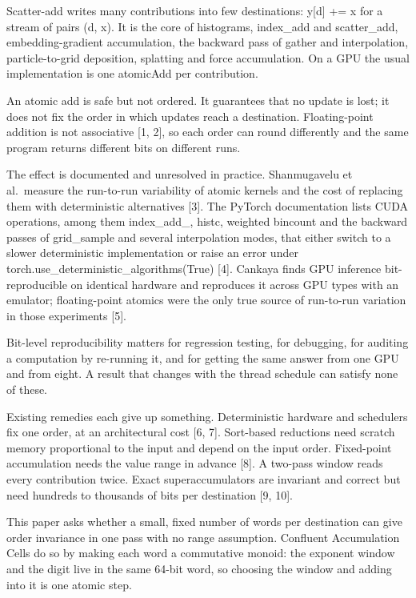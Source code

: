 \documentclass[journal]{IEEEtran}
\begin{document}
Scatter-add writes many contributions into few destinations: y{[}d{]} +=
x for a stream of pairs (d, x). It is the core of histograms, index\_add
and scatter\_add, embedding-gradient accumulation, the backward pass of
gather and interpolation, particle-to-grid deposition, splatting and
force accumulation. On a GPU the usual implementation is one atomicAdd
per contribution.

An atomic add is safe but not ordered. It guarantees that no update is
lost; it does not fix the order in which updates reach a destination.
Floating-point addition is not associative {[}1, 2{]}, so each order can
round differently and the same program returns different bits on
different runs.

The effect is documented and unresolved in practice. Shanmugavelu et
al.~measure the run-to-run variability of atomic kernels and the cost of
replacing them with deterministic alternatives {[}3{]}. The PyTorch
documentation lists CUDA operations, among them index\_add\_, histc,
weighted bincount and the backward passes of grid\_sample and several
interpolation modes, that either switch to a slower deterministic
implementation or raise an error under
torch.use\_deterministic\_algorithms(True) {[}4{]}. Cankaya finds GPU
inference bit-reproducible on identical hardware and reproduces it
across GPU types with an emulator; floating-point atomics were the only
true source of run-to-run variation in those experiments {[}5{]}.

Bit-level reproducibility matters for regression testing, for debugging,
for auditing a computation by re-running it, and for getting the same
answer from one GPU and from eight. A result that changes with the
thread schedule can satisfy none of these.

Existing remedies each give up something. Deterministic hardware and
schedulers fix one order, at an architectural cost {[}6, 7{]}.
Sort-based reductions need scratch memory proportional to the input and
depend on the input order. Fixed-point accumulation needs the value
range in advance {[}8{]}. A two-pass window reads every contribution
twice. Exact superaccumulators are invariant and correct but need
hundreds to thousands of bits per destination {[}9, 10{]}.

This paper asks whether a small, fixed number of words per destination
can give order invariance in one pass with no range assumption.
Confluent Accumulation Cells do so by making each word a commutative
monoid: the exponent window and the digit live in the same 64-bit word,
so choosing the window and adding into it is one atomic step.
\end{document}

